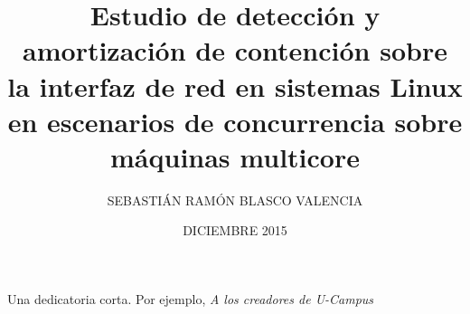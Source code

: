 \documentclass[upright, contnum]{umemoria}
\author{SEBASTIÁN RAMÓN BLASCO VALENCIA}
\title{Estudio de detección y amortización de contención sobre la interfaz de red en sistemas Linux en escenarios de concurrencia sobre máquinas multicore}
\date{DICIEMBRE 2015}
\begin{document}
\frontmatter
\maketitle



\begin{dedicatoria} %
Una dedicatoria corta. Por ejemplo, \emph{A los creadores de U-Campus}
\end{dedicatoria}

\begin{thanks} %
\lipsum[1-2]
\end{thanks}
\cleardoublepage

\tableofcontents
\listoftables %
\listoffigures %

\mainmatter

%

%
%

%



%

%







\end{document}
